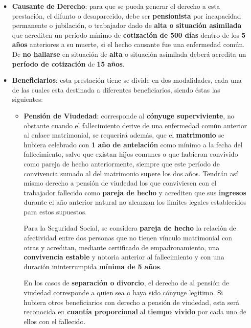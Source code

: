 \begin{itemize}
    \item \textbf{Causante de Derecho}: para que se pueda generar el derecho a esta prestación, el difunto o desaparecido, debe ser \textbf{pensionista} por incapacidad permanente o jubilación, o trabajador dado de \textbf{alta o situación asimilada} que acrediten un período mínimo de \textbf{cotización de 500 días} dentro de los \textbf{5 años} anteriores a su muerte, si el hecho causante fue una enfermedad común. De \textbf{no hallarse} en situación de \textbf{alta} o situación asimilada deberá acredita un \textbf{período de cotización} de \textbf{15 años}.

    \item \textbf{Beneficiarios}: esta prestación tiene se divide en dos modalidades, cada una de las cuales esta destinada a diferentes beneficiarios, siendo éstas las siguientes:

    \begin{itemize}
        \item \textbf{Pensión de Viudedad}: corresponde al \textbf{cónyuge superviviente}, no obstante cuando el fallecimiento derive de una enfermedad común anterior al enlace matrimonial, se requerirá además, que el \textbf{matrimonio} se hubiera celebrado con \textbf{1 año de antelación} como mínimo a la fecha del fallecimiento, salvo que existan hijos comunes o que hubieran convivido como pareja de hecho anteriormente, siempre que este período de convivencia sumado al del matrimonio supere los dos años. Tendrán así mismo derecho a pensión de viudedad los que conviviesen con el trabajador fallecido como \textbf{pareja de hecho} y acrediten que sus \textbf{ingresos} durante el año anterior natural no alcanzan los limites legales establecidos para estos supuestos.

        Para la Seguridad Social, se considera \textbf{pareja de hecho} la relación de afectividad entre dos personas que no tienen vínculo matrimonial con otras y acreditan, mediante certificado de empadronamiento, una \textbf{convivencia estable} y notoria anterior al fallecimiento y con una duración ininterrumpida \textbf{mínima de 5 años}.

        En los casos de \textbf{separación o divorcio}, el derecho de al pensión de viudedad corresponde a quien sea o haya sido cónyuge legítimo. Si hubiera otros beneficiarios con derecho a pensión de viudedad, esta será reconocida en \textbf{cuantía proporcional} al \textbf{tiempo vivido} por cada uno de ellos con el fallecido.


\end{itemize}
\end{itemize}
